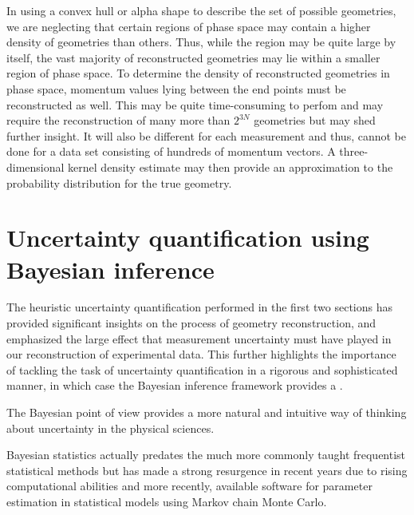 In using a convex hull or alpha shape to describe the set of possible geometries, we are neglecting that certain regions of phase space may contain a higher density of geometries than others. Thus, while the region may be quite large by itself, the vast majority of reconstructed geometries may lie within a smaller region of phase space. To determine the density of reconstructed geometries in phase space, momentum values lying between the end points must be reconstructed as well. This may be quite time-consuming to perfom and may require the reconstruction of many more than $2^{3N}$ geometries but may shed further insight. It will also be different for each measurement and thus, cannot be done for a data set consisting of hundreds of momentum vectors. A three-dimensional kernel density estimate may then provide an approximation to the probability distribution for the true geometry.


\section{Uncertainty quantification using Bayesian inference} \label{sec:uncertaintyBayesian}
The heuristic uncertainty quantification performed in the first two sections has provided significant insights on the process of geometry reconstruction, and emphasized the large effect that measurement uncertainty must have played in our reconstruction of experimental data. This further highlights the importance of tackling the task of uncertainty quantification in a rigorous and sophisticated manner, in which case the Bayesian inference framework provides a .

The Bayesian point of view provides a more natural and intuitive way of thinking about uncertainty in the physical sciences.


Bayesian statistics actually predates the much more commonly taught frequentist statistical methods but has made a strong resurgence in recent years due to rising computational abilities and more recently, available software for parameter estimation in statistical models using Markov chain Monte Carlo.

